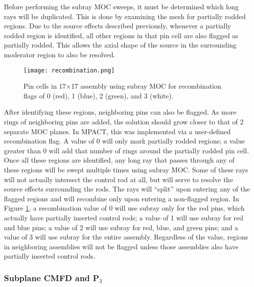 Before performing the subray MOC sweeps, it must be determined which long rays will be duplicated.  This is done by examining the mesh for partially rodded regions.  Due to the source effects described previously, whenever a partially rodded region is identified, all other regions in that pin cell are also flagged as partially rodded.  This allows the axial shape of the source in the surrounding moderator region to also be resolved.

\begin{figure}
    \centering
    \texttt{[image: recombination.png]}
    \caption{Pin cells in 17$\times$17 assembly using subray MOC for recombination flags of 0 (red), 1 (blue), 2 (green), and 3 (white).}\label{f:recombination}
\end{figure}

After identifying these regions, neighboring pins can also be flagged.  As more rings of neighboring pins are added, the solution should grow closer to that of 2 separate MOC planes.  In MPACT, this was implemented via a user-defined recombination flag.  A value of 0 will only mark partially rodded regions; a value greater than 0 will add that number of rings around the partially rodded pin cell.  Once all these regions are identified, any long ray that passes through any of these regions will be swept multiple times using subray MOC.  Some of these rays will not actually intersect the control rod at all, but will serve to resolve the source effects surrounding the rods.  The rays will ``split'' upon entering any of the flagged regions and will recombine only upon entering a non-flagged region.  In Figure \ref{f:recombination}, a recombination value of 0 will use subray only for the red pins, which actually have partially inserted control rods; a value of 1 will use subray for red and blue pins; a value of 2 will use subray for red, blue, and green pins; and a value of 3 will use subray for the entire assembly.  Regardless of the value, regions in neighboring assemblies will not be flagged unless those assemblies also have partially inserted control rods.

\subsubsection{Subplane CMFD and \texorpdfstring{P$_3$}{P3}}

